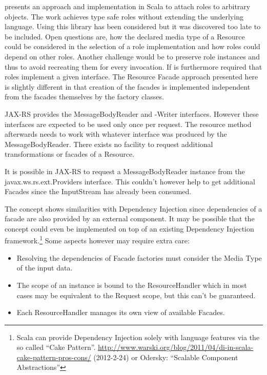 \documentclass[12pt,a4paper]{scrartcl}		%
\newcommand{\citeurl}[2]{\url{#1} (#2)}
\begin{document}
\cite{Pradel2008a} presents an approach and implementation in Scala to attach
roles to arbitrary objects. The work achieves type safe roles without extending
the underlying language. Using this library has been considered but it was
discovered too late to be included. Open questions are, how the declared media
type of a Resource could be considered in the selection of a role implementation
and how roles could depend on other roles. Another challenge would be to
preserve role instances and thus to avoid recreating them for every
invocation. If is furthermore required that roles implement a given
interface. The Resource Facade approach presented here is slightly different in
that creation of the facades is implemented independent from the facades
themselves by the factory classes.

JAX-RS provides the MessageBodyReader and -Writer interfaces. However these
interfaces are expected to be used only once per request. The resource method
afterwards needs to work with whatever interface was produced by the
MessageBodyReader. There exists no facility to request additional
transformations or facades of a Resource.

It is possible in JAX-RS to request a MessageBodyReader instance from the
javax.ws.rs.ext.Providers interface. This couldn't however help to get
additional Facades since the InputStream has already been consumed.

The concept shows similarities with Dependency Injection since dependencies of a
facade are also provided by an external component. It may be possible that the
concept could even be implemented on top of an existing Dependency Injection
framework.\footnote{Scala can provide Dependency Injection solely with language
  features via the so called ``Cake
  Pattern''. \citeurl{http://www.warski.org/blog/2011/04/di-in-scala-cake-pattern-pros-cons/}{2012-2-24}
  or Odersky: ``Scalable Component Abstractions''} Some aspects however may
require extra care:

\begin{itemize}
\item Resolving the dependencies of Facade factories must consider the Media
  Type of the input data.
\item The scope of an instance is bound to the ResourceHandler which in most
  cases may be equivalent to the Request scope, but this can't be guaranteed.
\item Each ResourceHandler manages its own view of available Facades.
\end{itemize}
\end{document}
